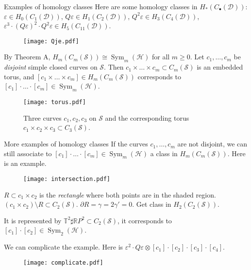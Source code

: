\documentclass[10pt]{beamer}
\renewcommand{\epsilon}{\varepsilon}
\renewcommand{\H}{\mathcal{H}}
\newcommand{\R}{\mathbb{R}}
\newcommand{\D}{\mathcal{D}}
\renewcommand{\S}{\mathcal{S}}
\newcommand{\Cb}{C_{\bullet}}
\DeclareMathOperator{\Sym}{Sym}
\begin{document}
\begin{frame}{Examples of homology classes}
Here are some homology classes in $H_*(\Cb(\D))$: $\epsilon\in H_0(C_1(\D))$, $Q\epsilon\in H_1(C_2(\D))$, $Q^2\epsilon\in H_3(C_4(\D))$,
$\epsilon^3\cdot (Q\epsilon)^2\cdot Q^2\epsilon\in H_5(C_{11}(\D))$.

\begin{figure}[h]
\texttt{[image: Qje.pdf]}
\end{figure}

\pause
By Theorem A, $H_m(C_m(\S))\cong \Sym_m(\H)$ for all $m\geq 0$.
\pause
Let $c_1,\dots,c_m$ be \emph{disjoint} simple closed curves
on $\S$. Then $c_1\times\dots\times c_m\subset C_m(\S)$ is an embedded torus,
and $[c_1\times\dots\times c_m]\in H_m(C_m(\S))$ corresponds to $[c_1]\cdot\dots\cdot[c_m]\in\Sym_m(\H)$.

\begin{figure}[h]
\texttt{[image: torus.pdf]}
\caption{Three curves $c_1,c_2,c_3$ on $\S$ and the corresponding torus $c_1\times c_2\times c_3\subset C_3(\S)$.}
\end{figure}
\end{frame}

\begin{frame}{More examples of homology classes}
If the curves $c_1,\dots,c_m$ are not disjoint, we can still associate to $[c_1]\cdot\dots\cdot[c_m]\in\Sym_m(\H)$
a class in $H_m(C_m(\S))$. Here is an example.
\begin{figure}[h]
\texttt{[image: intersection.pdf]}
\end{figure}
\pause
$R\subset c_1\times c_2$
is the \emph{rectangle} where both points are in the shaded region. $(c_1\times c_2)\setminus R\subset C_2(\S)$. $\partial R=\gamma=2\gamma'=0$.
Get class in $H_2(C_2(\S))$.

It is represented by $\mathbb{T}^2\sharp\R P^2\subset C_2(\S)$, it corresponds to $[c_1]\cdot[c_2]\in\Sym_2(\H)$.

\pause
\vspace{0.2cm}
We can complicate the example. Here is $\epsilon^2\cdot Q\epsilon\otimes [c_1]\cdot[c_2]\cdot[c_3]\cdot[c_4]$.
\begin{figure}[h]
\texttt{[image: complicate.pdf]}
\end{figure}
\end{frame}
\end{document}

